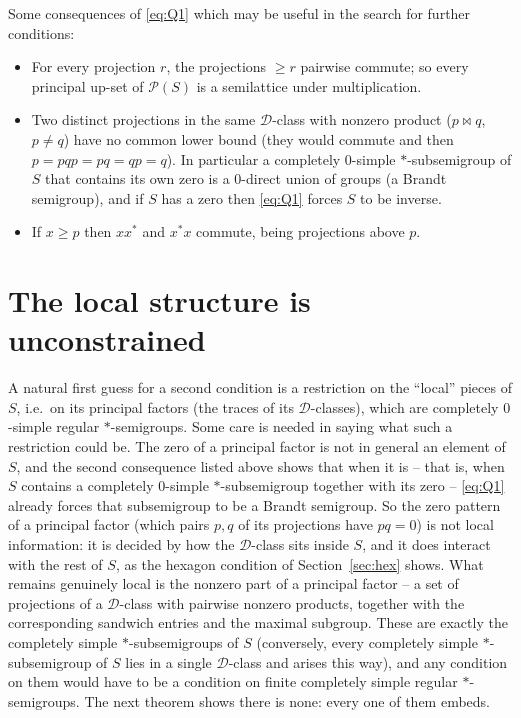 \documentclass[11pt]{amsart}
\theoremstyle{definition}
\newcommand{\D}{\mathcal{D}}
\renewcommand{\P}{\mathcal{P}}
\begin{document}
Some consequences of \eqref{eq:Q1} which may be useful in the search for further conditions:
\begin{itemize}[nosep]
\item For every projection $r$, the projections $\ge r$ pairwise commute; so every principal up-set of $\P(S)$ is a semilattice under multiplication.
\item Two distinct projections in the same $\D$-class with nonzero product ($p\bowtie q$, $p\ne q$) have no common lower bound (they would commute and then $p=pqp=pq=qp=q$). In particular a completely $0$-simple $*$-subsemigroup of $S$ that contains its own zero is a $0$-direct union of groups (a Brandt semigroup), and if $S$ has a zero then \eqref{eq:Q1} forces $S$ to be inverse.
\item If $x\ge p$ then $xx^*$ and $x^*x$ commute, being projections above $p$.
\end{itemize}

\section{The local structure is unconstrained}\label{sec:local}

A natural first guess for a second condition is a restriction on the ``local'' pieces of $S$, i.e.\ on its principal factors (the traces of its $\D$-classes), which are completely $0$-simple regular $*$-semigroups. Some care is needed in saying what such a restriction could be. The zero of a principal factor is not in general an element of $S$, and the second consequence listed above shows that when it is -- that is, when $S$ contains a completely $0$-simple $*$-subsemigroup together with its zero -- \eqref{eq:Q1} already forces that subsemigroup to be a Brandt semigroup. So the zero pattern of a principal factor (which pairs $p,q$ of its projections have $pq=0$) is not local information: it is decided by how the $\D$-class sits inside $S$, and it does interact with the rest of $S$, as the hexagon condition of Section~\ref{sec:hex} shows. What remains genuinely local is the nonzero part of a principal factor -- a set of projections of a $\D$-class with pairwise nonzero products, together with the corresponding sandwich entries and the maximal subgroup. These are exactly the completely simple $*$-subsemigroups of $S$ (conversely, every completely simple $*$-subsemigroup of $S$ lies in a single $\D$-class and arises this way), and any condition on them would have to be a condition on finite completely simple regular $*$-semigroups. The next theorem shows there is none: every one of them embeds.
\end{document}
